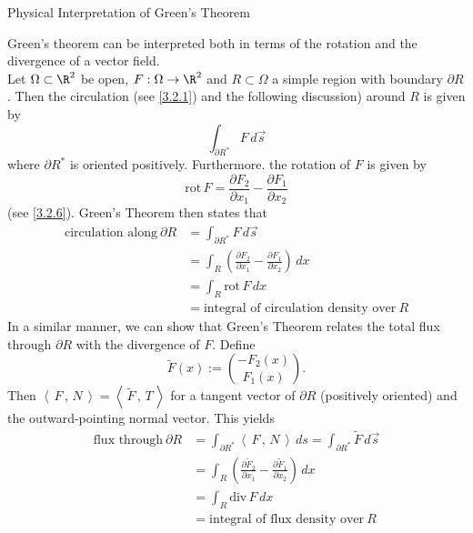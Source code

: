\documentclass[smaller,hyperref={CJKbookmarks=true}]{beamer}
\newcommand{\scp}[2]{\left\langle\,#1\,,\,#2\,\right\rangle} \newcommand{\scpp}{\langle\,\cdot\,,\,\cdot\,\rangle}
\begin{document}
\begin{frame}{Physical Interpretation of Green's Theorem}
\begin{spacing}{1.05}
Green's theorem can be interpreted both in terms of the rotation and the
divergence of a vector field.\\[6pt]
Let $\Omega\subset\R^2$ be open, $F:\Omega\to\R^2$ and $R\subset\Omega$ a simple region with boundary $\partial R$. Then the circulation (see \eqref{3.2.1}) and the following discussion) around $R$ is given by
\[\int_{\partial R^*}F\,d\vec{s}\]
where $\partial R^*$ is oriented positively. Furthermore. the rotation of $F$ is given by
\[\text{rot}\,F=\frac{\partial F_2}{\partial x_1}-\frac{\partial F_1}{\partial x_2}\]
(see \eqref{3.2.6}).
\newpage
\vspace*{18pt}
Green's Theorem then states that
\begin{equation*}
  \begin{split}
     \text{circulation along}~\partial R &=\int_{\partial R^*}F\,d\vec{s} \\
       &=\int_R\left(\frac{\partial F_2}{\partial x_1}-\frac{\partial F_1}{\partial x_2}\right)\,dx \\
       &=\int_R\text{rot}\,F\,dx \\
       &=\text{integral of circulation density over}~R
  \end{split}
\end{equation*}
\newpage
In a similar manner, we can show that Green's Theorem relates the total
flux through $\partial R$ with the divergence of $F$. Define
\[\widetilde{F}(x):=\binom{-F_2(x)}{F_1(x)}.\]
Then $\scp{F}{N}=\scp{\widetilde{F}}{T}$ for a tangent vector of $\partial R$ (positively oriented) and the outward-pointing normal vector. This yields
\begin{equation*}
  \begin{split}
     \text{flux through}~\partial R &=\int_{\partial R^*}\scp{F}{N}\,ds=\int_{\partial R^*}\widetilde{F}\,d\vec{s} \\
       &=\int_R\left(\frac{\partial\widetilde{F}_2}{\partial x_1}-\frac{\partial\widetilde{F}_1}{\partial x_2}\right)\,dx \\
       &=\int_R\text{div}\,F\,dx \\
       &=\text{integral of flux density over}~R
  \end{split}
\end{equation*}
\end{spacing}
\end{frame}
\end{document}
